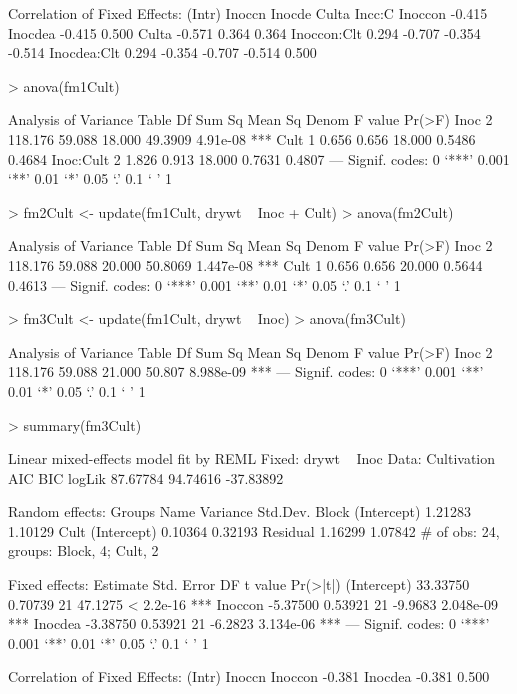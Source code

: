 \documentclass[12pt]{article}
\begin{document}
\begin{Schunk}
\begin{Soutput}
Correlation of Fixed Effects:
            (Intr) Inoccn Inocde Culta  Incc:C
Inoccon     -0.415                            
Inocdea     -0.415  0.500                     
Culta       -0.571  0.364  0.364              
Inoccon:Clt  0.294 -0.707 -0.354 -0.514       
Inocdea:Clt  0.294 -0.354 -0.707 -0.514  0.500
\end{Soutput}
\begin{Sinput}
> anova(fm1Cult)
\end{Sinput}
\begin{Soutput}
Analysis of Variance Table
          Df  Sum Sq Mean Sq   Denom F value   Pr(>F)    
Inoc       2 118.176  59.088  18.000 49.3909 4.91e-08 ***
Cult       1   0.656   0.656  18.000  0.5486   0.4684    
Inoc:Cult  2   1.826   0.913  18.000  0.7631   0.4807    
---
Signif. codes:  0 `***' 0.001 `**' 0.01 `*' 0.05 `.' 0.1 ` ' 1 
\end{Soutput}
\begin{Sinput}
> fm2Cult <- update(fm1Cult, drywt ~ Inoc + Cult)
> anova(fm2Cult)
\end{Sinput}
\begin{Soutput}
Analysis of Variance Table
     Df  Sum Sq Mean Sq   Denom F value    Pr(>F)    
Inoc  2 118.176  59.088  20.000 50.8069 1.447e-08 ***
Cult  1   0.656   0.656  20.000  0.5644    0.4613    
---
Signif. codes:  0 `***' 0.001 `**' 0.01 `*' 0.05 `.' 0.1 ` ' 1 
\end{Soutput}
\begin{Sinput}
> fm3Cult <- update(fm1Cult, drywt ~ Inoc)
> anova(fm3Cult)
\end{Sinput}
\begin{Soutput}
Analysis of Variance Table
     Df  Sum Sq Mean Sq   Denom F value    Pr(>F)    
Inoc  2 118.176  59.088  21.000  50.807 8.988e-09 ***
---
Signif. codes:  0 `***' 0.001 `**' 0.01 `*' 0.05 `.' 0.1 ` ' 1 
\end{Soutput}
\begin{Sinput}
> summary(fm3Cult)
\end{Sinput}
\begin{Soutput}
Linear mixed-effects model fit by REML
Fixed: drywt ~ Inoc 
 Data: Cultivation 
      AIC      BIC    logLik
 87.67784 94.74616 -37.83892

Random effects:
 Groups   Name        Variance Std.Dev.
 Block    (Intercept) 1.21283  1.10129 
 Cult     (Intercept) 0.10364  0.32193 
 Residual             1.16299  1.07842 
# of obs: 24, groups: Block, 4; Cult, 2

Fixed effects:
            Estimate Std. Error DF t value  Pr(>|t|)    
(Intercept) 33.33750    0.70739 21 47.1275 < 2.2e-16 ***
Inoccon     -5.37500    0.53921 21 -9.9683 2.048e-09 ***
Inocdea     -3.38750    0.53921 21 -6.2823 3.134e-06 ***
---
Signif. codes:  0 `***' 0.001 `**' 0.01 `*' 0.05 `.' 0.1 ` ' 1 

Correlation of Fixed Effects:
        (Intr) Inoccn
Inoccon -0.381       
Inocdea -0.381  0.500
\end{Soutput}
\end{Schunk}
\end{document}
